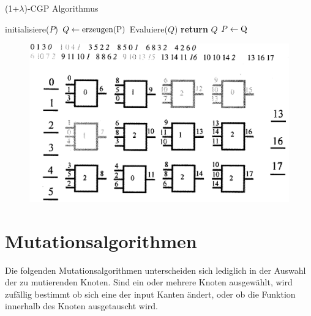 \begin{algorithm}
\caption{(1+$\lambda$)-CGP Algorithmus}
\begin{algorithmic}[1]
   \State initialisiere($P$) 
      \State $Q \gets \textnormal{erzeugen(P)}$ 
      \State Evaluiere($Q$) 
              \State \textbf{return} $Q$
      \EndIf
               \State $P \gets \textnormal{Q}$ 
      \EndIf
   \EndWhile
\EndProcedure
\end{algorithmic}
\end{algorithm}



\begin{figure}
\includegraphics[scale=0.3]{cgpExample}
\caption[Beispielhafter Aufbau eines CGP]{}
\label{fig:cgpExample}
\end{figure}

\section{Mutationsalgorithmen}

Die folgenden Mutationsalgorithmen unterscheiden sich lediglich in der Auswahl der zu mutierenden Knoten. Sind ein oder mehrere Knoten ausgewählt, wird zufällig bestimmt ob sich eine der input Kanten ändert, oder ob die Funktion innerhalb des Knoten ausgetauscht wird.



